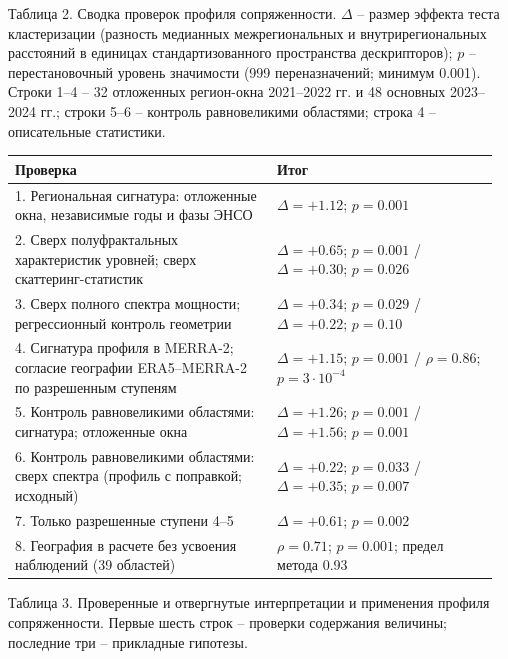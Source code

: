 \documentclass[12pt,a4paper]{article}
\begin{document}
\clearpage
\noindent Таблица 2. Сводка проверок профиля сопряженности. $\Delta$ -- размер эффекта теста кластеризации (разность медианных межрегиональных и внутрирегиональных расстояний в единицах стандартизованного пространства дескрипторов); $p$ -- перестановочный уровень значимости (999 переназначений; минимум 0.001). Строки 1--4 -- 32 отложенных регион-окна 2021--2022 гг. и 48 основных 2023--2024 гг.; строки 5--6 -- контроль равновеликими областями; строка 4 -- описательные статистики.

\begin{singlespace}
\noindent\begin{tabular}{@{}p{0.52\linewidth}p{0.44\linewidth}@{}}
\toprule
Проверка & Итог\\
\midrule
1. Региональная сигнатура: отложенные окна, независимые годы и фазы ЭНСО & $\Delta = +1.12$; $p = 0.001$\\
2. Сверх полуфрактальных характеристик уровней; сверх скаттеринг-статистик & $\Delta = +0.65$; $p = 0.001$ / $\Delta = +0.30$; $p = 0.026$\\
3. Сверх полного спектра мощности; регрессионный контроль геометрии & $\Delta = +0.34$; $p = 0.029$ / $\Delta = +0.22$; $p = 0.10$\\
4. Сигнатура профиля в MERRA-2; согласие географии ERA5--MERRA-2 по разрешенным ступеням & $\Delta = +1.15$; $p = 0.001$ / $\rho = 0.86$; $p = 3 \cdot 10^{-4}$\\
5. Контроль равновеликими областями: сигнатура; отложенные окна & $\Delta = +1.26$; $p = 0.001$ / $\Delta = +1.56$; $p = 0.001$\\
6. Контроль равновеликими областями: сверх спектра (профиль с поправкой; исходный) & $\Delta = +0.22$; $p = 0.033$ / $\Delta = +0.35$; $p = 0.007$\\
7. Только разрешенные ступени 4--5 & $\Delta = +0.61$; $p = 0.002$\\
8. География в расчете без усвоения наблюдений (39 областей) & $\rho = 0.71$; $p = 0.001$; предел метода 0.93\\
\bottomrule
\end{tabular}
\end{singlespace}

\clearpage
\noindent Таблица 3. Проверенные и отвергнутые интерпретации и применения профиля сопряженности. Первые шесть строк -- проверки содержания величины; последние три -- прикладные гипотезы.
\end{document}
